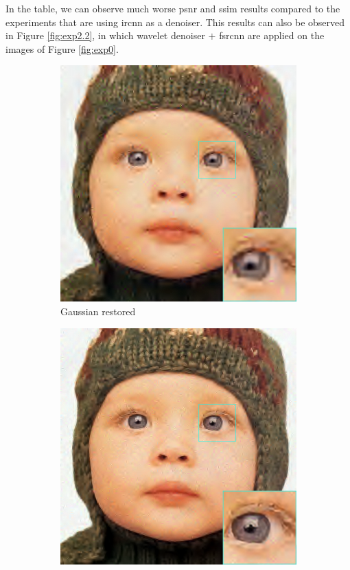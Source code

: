 In the table, we can observe much worse \gls{psnr} and \gls{ssim} results compared to the experiments that are using \gls{ircnn} as a denoiser. This results can also be observed in Figure \ref{fig:exp2.2}, in which wavelet denoiser $+$ \gls{fsrcnn} are applied on the images of Figure \ref{fig:exp0}.

\begin{figure}
	\centering
	\begin{subfigure}{0.24\textwidth}
		\includegraphics[width=\textwidth]{images/exp2.2/gaussian.png}
		\caption{Gaussian restored}
	\end{subfigure}
	\begin{subfigure}{0.24\textwidth}
		\includegraphics[width=\textwidth]{images/exp2.2/poisson.png}

\end{subfigure}
\end{figure}
